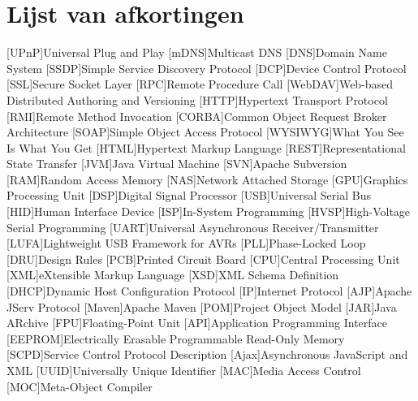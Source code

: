 %
%

\listoffigures


%
%

\lstlistoflistings


%
%

\chapter*{Lijst van afkortingen}

\begin{acronym}[WYSIWYG]	%

[UPnP]{Universal Plug and Play}
[mDNS]{Multicast DNS}
[DNS]{Domain Name System}
[SSDP]{Simple Service Discovery Protocol}
[DCP]{Device Control Protocol}
[SSL]{Secure Socket Layer}
[RPC]{Remote Procedure Call}
[WebDAV]{Web-based Distributed Authoring and Versioning}
[HTTP]{Hypertext Transport Protocol}
[RMI]{Remote Method Invocation}
[CORBA]{Common Object Request Broker Architecture}
[SOAP]{Simple Object Access Protocol}
[WYSIWYG]{What You See Is What You Get}
[HTML]{Hypertext Markup Language}
[REST]{Representational State Transfer}
[JVM]{Java Virtual Machine}
[SVN]{Apache Subversion}
[RAM]{Random Access Memory}
[NAS]{Network Attached Storage}
[GPU]{Graphics Processing Unit}
[DSP]{Digital Signal Processor}
[USB]{Universal Serial Bus}
[HID]{Human Interface Device}
[ISP]{In-System Programming}
[HVSP]{High-Voltage Serial Programming}
[UART]{Universal Asynchronous Receiver/Transmitter}
[LUFA]{Lightweight USB Framework for AVRs}
[PLL]{Phase-Locked Loop}
[DRU]{Design Rules}
[PCB]{Printed Circuit Board}
[CPU]{Central Processing Unit}
[XML]{eXtensible Markup Language}
[XSD]{XML Schema Definition}
[DHCP]{Dynamic Host Configuration Protocol}
[IP]{Internet Protocol}
[AJP]{Apache JServ Protocol}
[Maven]{Apache Maven}
[POM]{Project Object Model}
[JAR]{Java ARchive}
[FPU]{Floating-Point Unit}
[API]{Application Programming Interface}
[EEPROM]{Electrically Erasable Programmable Read-Only Memory}
[SCPD]{Service Control Protocol Description}
[Ajax]{Asynchronous JavaScript and XML}
[UUID]{Universally Unique Identifier}
[MAC]{Media Access Control}
[MOC]{Meta-Object Compiler}

\end{acronym}
